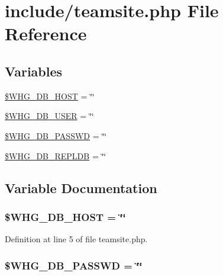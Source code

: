 \hypertarget{teamsite_8php}{\section{include/teamsite.php File Reference}
\label{teamsite_8php}
}
\subsection*{Variables}
\begin{DoxyCompactItemize}
\item 
\hyperlink{teamsite_8php_a8911465dd0c304044f55df8933846080}{\$\-W\-H\-G\-\_\-\-D\-B\-\_\-\-H\-O\-S\-T} = \char`\"{}\char`\"{}
\item 
\hyperlink{teamsite_8php_a52a3f609b0d083664c23d05d073c6dee}{\$\-W\-H\-G\-\_\-\-D\-B\-\_\-\-U\-S\-E\-R} = \char`\"{}\char`\"{}
\item 
\hyperlink{teamsite_8php_a2e6dace79abbfbefd6922b7d2540f5e2}{\$\-W\-H\-G\-\_\-\-D\-B\-\_\-\-P\-A\-S\-S\-W\-D} = \char`\"{}\char`\"{}
\item 
\hyperlink{teamsite_8php_a4b1c508b79ac689ba132fef093f1fc72}{\$\-W\-H\-G\-\_\-\-D\-B\-\_\-\-R\-E\-P\-L\-D\-B} = \char`\"{}\char`\"{}
\end{DoxyCompactItemize}


\subsection{Variable Documentation}
\hypertarget{teamsite_8php_a8911465dd0c304044f55df8933846080}{
\subsubsection[{\$\-W\-H\-G\-\_\-\-D\-B\-\_\-\-H\-O\-S\-T}]{\setlength{\rightskip}{0pt plus 5cm}\$W\-H\-G\-\_\-\-D\-B\-\_\-\-H\-O\-S\-T = \char`\"{}\char`\"{}}}\label{teamsite_8php_a8911465dd0c304044f55df8933846080}


Definition at line 5 of file teamsite.\-php.

\hypertarget{teamsite_8php_a2e6dace79abbfbefd6922b7d2540f5e2}{
\subsubsection[{\$\-W\-H\-G\-\_\-\-D\-B\-\_\-\-P\-A\-S\-S\-W\-D}]{\setlength{\rightskip}{0pt plus 5cm}\$W\-H\-G\-\_\-\-D\-B\-\_\-\-P\-A\-S\-S\-W\-D = \char`\"{}\char`\"{}}}\label{teamsite_8php_a2e6dace79abbfbefd6922b7d2540f5e2}


